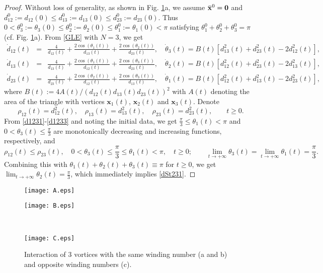 \documentclass{aims}
\theoremstyle{plain}
\theoremstyle{definition}
\newcommand{\bx}{{\mathbf x}}
\newcommand{\be} {\begin{equation}}
\newcommand{\ee}{\end{equation}}
\newcommand{\bea}{\begin{eqnarray}}
\newcommand{\eea}{\end{eqnarray} }
\begin{document}
\begin{proof} Without loss of
generality, as shown in Fig. \ref{vortex3}a, we assume $\bar\bx^0={\bf 0}$ and $d_{12}^0:=d_{12}(0)\le d_{13}^0:=d_{13}(0)\le d_{23}^0:=d_{23}(0)$.
Thus $0<\theta_3^0:=\theta_3(0)\le \theta_2^0:=\theta_2(0)\le
\theta_1^0:=\theta_1(0)<\pi$ satisfying
$\theta_1^0+\theta_2^0+\theta_3^0=\pi$ (cf. Fig. \ref{vortex3}a).
From \eqref{GLE} with $N=3$, we get
\bea\label{d1231}
\dot{d}_{12}(t)&=&\frac{4}{d_{12}(t)}+\frac{2\cos(\theta_{1}(t))}{d_{13}(t)}
+\frac{2\cos(\theta_2(t))}{d_{23}(t)},\quad
\dot\theta_{3}(t)=B(t)\left[d_{13}^2(t)+d_{23}^2(t)-2d_{12}^2(t)\right],\\
\label{d1232}
\dot{d}_{13}(t)&=&\frac{4}{d_{13}(t)}+\frac{2\cos(\theta_{1}(t))}{d_{12}(t)}
+\frac{2\cos(\theta_3(t))}{d_{23}(t)},\quad
\dot\theta_{2}(t)=B(t)\left[d_{12}^2(t)+d_{23}^2(t)-2d_{13}^2(t)\right],\qquad\\
\label{d1233}
\dot{d}_{23}(t)&=&\frac{4}{d_{23}(t)}+\frac{2\cos(\theta_{2}(t))}{d_{12}(t)}
+\frac{2\cos(\theta_3(t))}{d_{13}(t)},\quad
\dot\theta_{1}(t)=B(t)\left[d_{12}^2(t)+d_{13}^2(t)-2d_{23}^2(t)\right],
\eea
where $B(t):=4A(t)/(d_{12}(t)d_{13}(t)d_{23}(t))^2$ with
$A(t)$ denoting the area of the triangle with vertices
$\bx_1(t)$, $\bx_2(t)$ and $\bx_3(t)$.
Denote
\[\rho_{12}(t)=d_{12}^2(t),\quad
\rho_{13}(t)=d_{13}^2(t),\quad \rho_{23}(t)=d_{23}^2(t),\qquad
t\ge0.\]
From \eqref{d1231}-\eqref{d1233} and noting the initial data, we get
$\frac{\pi}{3}\le \theta_1(t)<\pi$ and $0<\theta_3(t)\le \frac{\pi}{3}$ are monotonically decreasing and increasing
functions, respectively, and
\be
\rho_{12}(t)\le \rho_{23}(t),\quad 0<\theta_3(t)\le\frac{\pi}{3}\le \theta_1(t)<\pi,
 \quad t\ge0; \qquad  \lim_{t\to+\infty}\theta_3(t)=\lim_{t\to+\infty}\theta_1(t)=\frac{\pi}{3}.
\ee
Combining this with $\theta_1(t)+\theta_2(t)+\theta_3(t)\equiv \pi$ for $t\ge0$, we get $\lim_{t\to+\infty}\theta_2(t)=\frac{\pi}{3}$, which immediately implies \eqref{dSt231}.
\end{proof}

\begin{figure}[bhtp]
\begin{minipage}[b]{0.4\textwidth}
\centering
\texttt{[image: A.eps]}
\end{minipage} \quad \quad
\begin{minipage}[b]{0.4\textwidth}
\centering
\texttt{[image: B.eps]}
\end{minipage}\\
\vfill
\begin{minipage}[l]{0.4\textwidth}
\centering
\texttt{[image: C.eps]}
\end{minipage}
\caption{Interaction of $3$ vortices
with the same winding number (a and b) and
opposite winding numbers (c).}\label{vortex3}
\end{figure}
\end{document}
